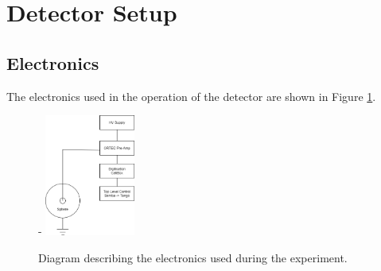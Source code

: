 \documentclass[a4paper]{article}
\begin{document}
\section{Detector Setup}
\subsection{Electronics}
The electronics used in the operation of the detector are shown in Figure \ref{fig:elec}.
\begin{figure}[H]-
    \centering
    \includegraphics[height=4cm]{plots/elec.png}
    \caption{Diagram describing the electronics used during the experiment.}
    \label{fig:elec}
\end{figure}
\end{document}
